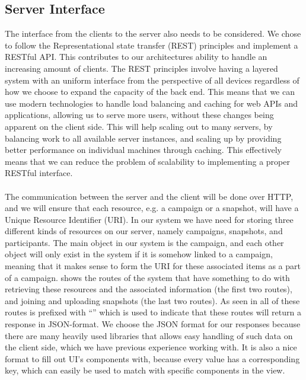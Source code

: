 \subsection{Server Interface}
\label{sub:server_interface}
The interface from the clients to the server also needs to be considered. We chose to follow the Representational state transfer (REST) principles \parencite{http_manden} and implement a RESTful API. This contributes to our architectures ability to handle an increasing amount of clients. The REST principles involve having a layered system with an uniform interface from the perspective of all devices regardless of how we choose to expand the capacity of the back end. This means that we can use modern technologies to handle load balancing and caching for web APIs and applications, allowing us to serve more users, without these changes being apparent on the client side. This will help scaling out to many servers, by balancing work to all available server instances, and scaling up by providing better performance on individual machines through caching. This effectively means that we can reduce the problem of scalability to implementing a proper RESTful interface. 
\\\\
The communication between the server and the client will be done over HTTP, and we will ensure that each resource, e.g. a campaign or a snapshot, will have a Unique Resource Identifier (URI). In our system we have need for storing three different kinds of resources on our server, namely campaigns, snapshots, and participants. The main object in our system is the campaign, and each other object will only exist in the system if it is somehow linked to a campaign, meaning that it makes sense to form the URI for these associated items as a part of a campaign.  shows the routes of the system that have something to do with retrieving these resources and the associated information (the first two routes), and joining and uploading snapshots (the last two routes). As seen in  all of these routes is prefixed with ``'' which is used to indicate that these routes will return a response in JSON-format. We choose the JSON format for our responses because there are many heavily used libraries that allows easy handling of such data on the client side, which we have previous experience working with. It is also a nice format to fill out UI's components with, because every value has a corresponding key, which can easily be used to match with specific components in the view. 

